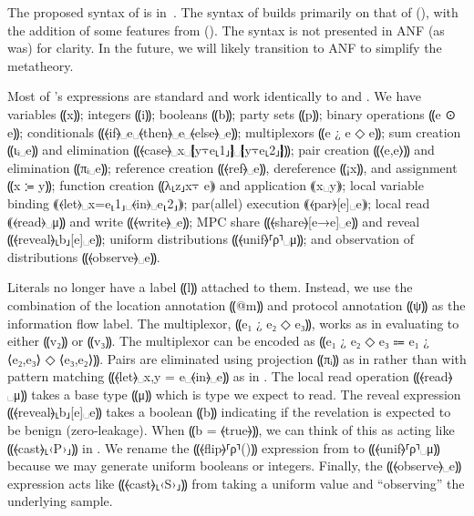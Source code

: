 The proposed syntax of \lang is in~. The syntax of \lang builds primarily
on that of \mpc (), with the addition of some features from \obliv ().
The syntax is not presented in ANF (as \mpc was) for clarity. In the future, we will likely transition
to ANF to simplify the metatheory.

Most of \lang's expressions are standard and work identically to \mpc and \obliv.
We have variables ⸨x⸩; integers ⸨i⸩; booleans ⸨b⸩; party sets ⸨p⸩;
binary operations ⸨e ⊙ e⸩;
conditionals ⸨⦑if⦒␣e␣⦑then⦒␣e␣⦑else⦒␣e⸩; multiplexors ⸨e ¿ e ◇ e⸩;
sum creation ⸨ιᵢ␣e⸩ and elimination ⸨⦑case⦒␣x␣❴y⍪e⸤1⸥❵␣❴y⍪e⸤2⸥❵⸩;
pair creation ⸨⟨e,e⟩⸩ and elimination ⸨πᵢ␣e⸩;
reference creation ⸨⦑ref⦒␣e⸩, dereference ⸨¡x⸩, and assignment ⸨x ≔ y⸩;
function creation ⸨λ⸤z⸥x⍪ e⸩ and application ⸨x␣y⸩;
local variable binding ⸨⦑let⦒␣x=e⸤1⸥␣⦑in⦒␣e⸤2⸥⸩;
par(allel) execution ⸨⦑par⦒[e]␣e⸩;
local read ⸨⦑read⦒␣μ⸩ and write ⸨⦑write⦒␣e⸩;
MPC share ⸨⦑share⦒[e→e]␣e⸩ and reveal ⸨⦑reveal⦒⸤b⸥[e]␣e⸩;
uniform distributions ⸨⦑unif⦒⸢ρ⸣␣μ⸩;
and observation of distributions ⸨⦑observe⦒␣e⸩.

Literals no longer have a label ⸨l⸩ attached to them. Instead, we use
the combination of the location annotation ⸨@m⸩ and protocol annotation
⸨ψ⸩ as the information flow label.
The multiplexor, ⸨e₁ ¿ e₂ ◇ e₃⸩, works as in \mpc evaluating to either
⸨v₂⸩ or ⸨v₃⸩. The \obliv multiplexor can be encoded as
⸨e₁ ¿ e₂ ◇ e₃ ⩴ e₁ ¿ ⟨e₂,e₃⟩ ◇ ⟨e₃,e₂⟩⸩. Pairs are eliminated using
projection ⸨πᵢ⸩ as in \mpc rather than with pattern matching ⸨⦑let⦒␣x,y = e␣⦑in⦒␣e⸩
as in \obliv. The local read operation ⸨⦑read⦒␣μ⸩ takes a base type ⸨μ⸩ which is
type we expect to read. The reveal expression ⸨⦑reveal⦒⸤b⸥[e]␣e⸩ takes a boolean
⸨b⸩ indicating if the revelation is expected to be benign (zero-leakage). When
⸨b = ⦑true⦒⸩, we can think of this as acting like ⸨⦑cast⦒⸤‹P›⸥⸩ in \obliv. We rename
the ⸨⦑flip⦒⸢ρ⸣()⸩ expression from \obliv to ⸨⦑unif⦒⸢ρ⸣␣μ⸩ because we may generate
uniform booleans or integers. Finally, the ⸨⦑observe⦒␣e⸩ expression acts like ⸨⦑cast⦒⸤‹S›⸥⸩
from \obliv taking a uniform value and ``observing'' the underlying sample.

